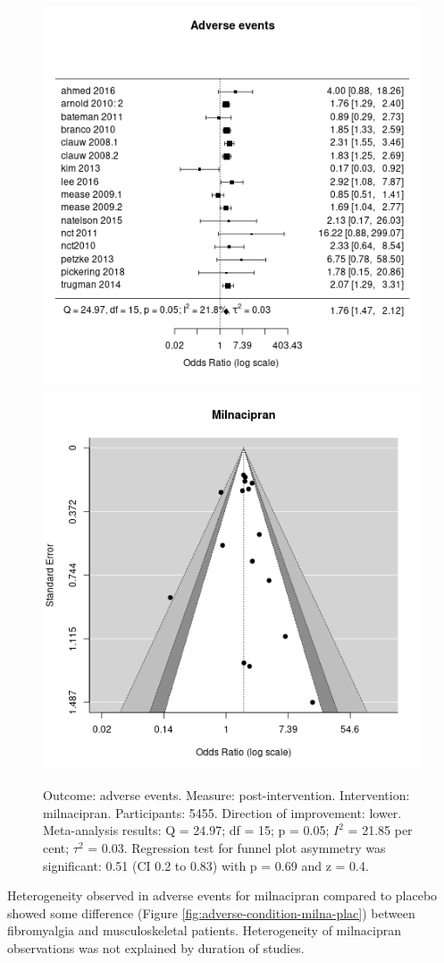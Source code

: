 \documentclass{report}\usepackage[]{graphicx}\usepackage[]{color}
\newenvironment{knitrout}{}{} %
\begin{document}
\begin{figure}

\begin{knitrout}
\color{fgcolor}
\includegraphics[width=0.5\linewidth,height=0.35\textheight]{img/adverse-milnacipran- - -forest} 
\includegraphics[width=0.5\linewidth,height=0.35\textheight]{img/adverse-milnacipran- - -funnel} 
\end{knitrout}

\caption[Adverse events: milnacipran]{Outcome: adverse events. Measure: post-intervention. Intervention: milnacipran. Participants: 5455. Direction of improvement: lower. Meta-analysis results: Q = 24.97; df = 15; p = 0.05; $I^2$ = 21.85 per cent; $\tau^2$ = 0.03. Regression test for funnel plot asymmetry was significant: 0.51 (CI 0.2 to 0.83) with p = 0.69 and z = 0.4.}
\label{fig:adverse-milna}
\end{figure}


Heterogeneity observed in adverse events for milnacipran compared to placebo showed some difference (Figure \ref{fig:adverse-condition-milna-plac}) between fibromyalgia and musculoskeletal patients. Heterogeneity of milnacipran observations was not explained by duration of studies.
\end{document}
